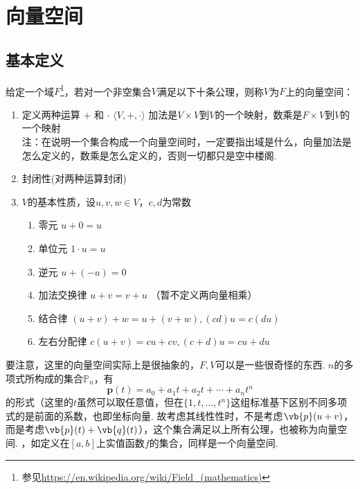 
\section{向量空间}
\subsection{基本定义}
\begin{definition}
给定一个域$F$\footnote{参见\url{https://en.wikipedia.org/wiki/Field_(mathematics)}}，若对一个非空集合$V$满足以下十条公理，则称$V$为$F$上的向量空间：
\begin{enumerate}
	\item 定义两种运算 $+$ 和 $\cdot$
		$ \langle V , +, \cdot \rangle$
		加法是$V\times V$到$V$的一个映射，数乘是$F\times V$到$V$的一个映射\\
		注：在说明一个集合构成一个向量空间时，一定要指出域是什么，向量加法是怎么定义的，数乘是怎么定义的，否则一切都只是空中楼阁.
	\item 封闭性(对两种运算封闭)
	\item $V$的基本性质，设$u,v,w\in V$，$c,d$为常数
		\begin{enumerate}
			\item 零元 $u+0=u$
			\item 单位元 $1\cdot u=u$
			\item 逆元 $u+(-u)=0$
			\item 加法交换律 $u+v=v+u$ （暂不定义两向量相乘）
			\item 结合律 $(u+v)+w=u+(v+w),(cd)u=c(du)$
			\item 左右分配律 $c(u+v)=cu+cv,(c+d)u=cu+du$
		\end{enumerate}
\end{enumerate}
\end{definition}
要注意，这里的向量空间实际上是很抽象的，$F,V$可以是一些很奇怪的东西.
$n$的多项式所构成的集合$\mathbb{P}_n$，有
\[\mathbf{p}(t)=a_0+a_1t+a_2t+\cdots+a_nt^n\]
的形式（这里的$t$虽然可以取任意值，但在$\{1,t,\dots,t^n\}$这组标准基下区别不同多项式的是前面的系数，也即坐标向量. 故考虑其线性性时，不是考虑$\vb{p}(u+v)$，而是考虑$\vb{p}(t)+\vb{q}(t)$），这个集合满足以上所有公理，也被称为向量空间.
，如定义在$[a,b]$上实值函数$f$的集合，同样是一个向量空间.

